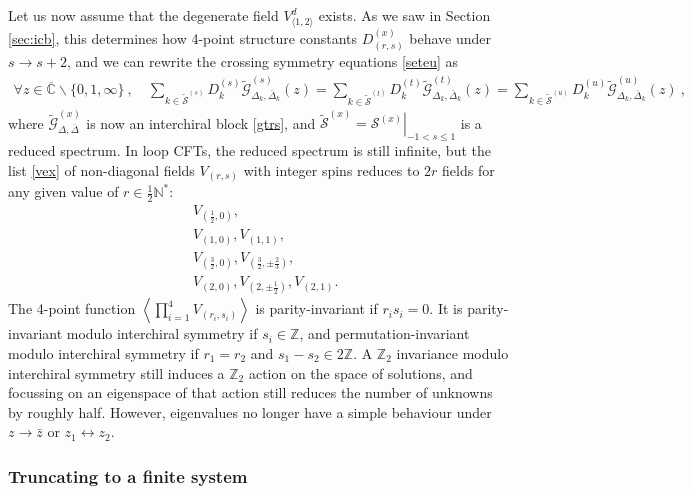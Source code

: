 \documentclass[12pt, a4paper]{article}
\theoremstyle{break}
\begin{document}
Let us now assume that the degenerate field $V^d_{\langle 1,2\rangle}$ exists. 
As we saw in Section \ref{sec:icb}, this determines how 4-point structure constants $D^{(x)}_{(r,s)}$ behave under $s\to s+2$, and we can rewrite the crossing symmetry equations \eqref{seteu} as 
\begin{align}
 \forall z\in \overline{\mathbb{C}}\backslash\{0,1,\infty\} \ , \quad \sum_{k\in\widetilde{\mathcal{S}}^{(s)}} D_k^{(s)} \widetilde{\mathcal{G}}^{(s)}_{\Delta_k,\bar\Delta_k}(z) = \sum_{k\in\widetilde{\mathcal{S}}^{(t)}} D_k^{(t)} \widetilde{\mathcal{G}}^{(t)}_{\Delta_k,\bar\Delta_k}(z) = \sum_{k\in\widetilde{\mathcal{S}}^{(u)}} D_k^{(u)} \widetilde{\mathcal{G}}^{(u)}_{\Delta_k,\bar\Delta_k}(z)\ ,
\end{align}
where $\widetilde{\mathcal{G}}^{(x)}_{\Delta,\bar\Delta}$ is now an interchiral block \eqref{gtrs}, and $\widetilde{\mathcal{S}}^{(x)}=\left.\mathcal{S}^{(x)}\right|_{-1<s\leq 1}$ is a reduced spectrum. In loop CFTs, the reduced spectrum is still infinite, but the list \eqref{vex} of non-diagonal fields $V_{(r,s)}$ with integer spins reduces to $2r$ fields for any given value of $r\in\frac12\mathbb{N}^*$:
\begin{subequations}
\label{vexr}
\begin{align}
 & V_{(\frac12, 0)},
 \\
 & V_{(1,0)}, V_{(1,1)}, 
 \\
 & V_{(\frac32, 0)}, V_{(\frac32, \pm\frac23)}, 
 \\
 & V_{(2, 0)}, V_{(2,\pm\frac12)}, V_{(2,1)}.
\end{align}
\end{subequations}
The 4-point function $\left<\prod_{i=1}^4 V_{(r_i,s_i)}\right>$ is parity-invariant if $r_is_i=0$. It is parity-invariant 
modulo interchiral symmetry if $s_i\in\mathbb{Z}$, and permutation-invariant modulo interchiral symmetry if $r_1=r_2$ and $s_1-s_2\in 2\mathbb{Z}$. A $\mathbb{Z}_2$ invariance modulo interchiral symmetry still induces a $\mathbb{Z}_2$ action on the space of solutions, and focussing on an eigenspace of that action still reduces the number of unknowns by roughly half. However, eigenvalues no longer have a simple behaviour under $z\to \bar z$ or $z_1\leftrightarrow z_2$.


\subsubsection{Truncating to a finite system}
\end{document}
